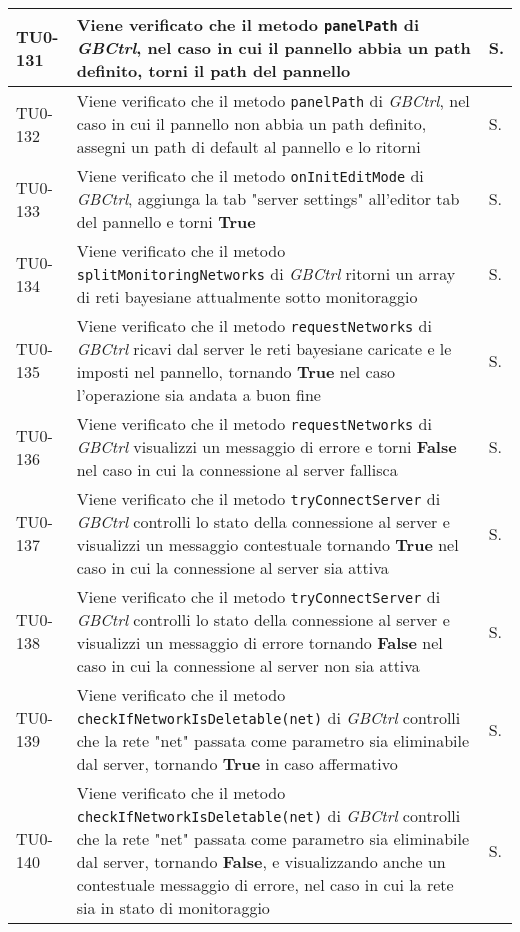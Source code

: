 \begin{longtable}{|C{.15\textwidth}|m{.66\textwidth}|C{.10\textwidth}|}
\hline
{}TU0-131 & Viene verificato che il metodo \texttt{panelPath} di \textit{GBCtrl}, nel caso in cui il pannello abbia un path definito, torni il path del pannello & S.\\
\hline
TU0-132 & Viene verificato che il metodo \texttt{panelPath} di \textit{GBCtrl}, nel caso in cui il pannello non abbia un path definito, assegni un path di default al pannello e lo ritorni & S.\\
\hline
{}TU0-133 & Viene verificato che il metodo \texttt{onInitEditMode} di \textit{GBCtrl}, aggiunga la tab "server settings" all'editor tab del pannello e torni \textbf{True} & S.\\
\hline
TU0-134 & Viene verificato che il metodo \texttt{splitMonitoringNetworks} di \textit{GBCtrl} ritorni un array di reti bayesiane attualmente sotto monitoraggio & S.\\
\hline
{}TU0-135 & Viene verificato che il metodo \texttt{requestNetworks} di \textit{GBCtrl} ricavi dal server le reti bayesiane caricate e le imposti nel pannello, tornando \textbf{True} nel caso l'operazione sia andata  a buon fine & S.\\
\hline
TU0-136 & Viene verificato che il metodo \texttt{requestNetworks} di \textit{GBCtrl} visualizzi un messaggio di errore e torni \textbf{False} nel caso in cui la connessione al server fallisca & S.\\
\hline
{}TU0-137 & Viene verificato che il metodo \texttt{tryConnectServer} di \textit{GBCtrl} controlli lo stato della connessione al server e visualizzi un messaggio contestuale tornando \textbf{True} nel caso in cui la connessione al server sia attiva & S.\\
\hline
TU0-138 & Viene verificato che il metodo \texttt{tryConnectServer} di \textit{GBCtrl} controlli lo stato della connessione al server e visualizzi un messaggio di errore tornando \textbf{False} nel caso in cui la connessione al server non sia attiva & S.\\
\hline
{}TU0-139 & Viene verificato che il metodo \texttt{checkIfNetworkIsDeletable(net)} di \textit{GBCtrl} controlli che la rete "net" passata come parametro sia eliminabile dal server, tornando \textbf{True} in caso affermativo & S.\\
\hline
TU0-140 & Viene verificato che il metodo \texttt{checkIfNetworkIsDeletable(net)} di \textit{GBCtrl} controlli che la rete "net" passata come parametro sia eliminabile dal server, tornando \textbf{False}, e visualizzando anche un contestuale messaggio di errore, nel caso in cui la rete sia in stato di monitoraggio & S.\\

\end{longtable}
